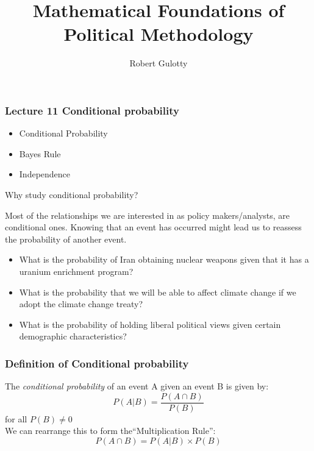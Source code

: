\documentclass[handout]{beamer}
\title[PLSC 43401]{Mathematical Foundations of Political Methodology}
\author{Robert Gulotty}
\institute[Chicago]{University of Chicago}
\numberwithin{equation}{section}
\begin{document}
\begin{frame}
\maketitle
\end{frame}

\begin{frame}
\frametitle{Lecture 11 Conditional probability}

\begin{itemize}
\item Conditional Probability
\item Bayes Rule
\item Independence
\end{itemize}
\end{frame}

\begin{frame}{Why study conditional probability?}

Most of the relationships we are interested in as policy makers/analysts, are conditional ones. Knowing that an event has occurred might lead us to reassess the probability of another event.\pause

\begin{itemize}
\item What is the probability of Iran obtaining nuclear weapons given that it has a uranium enrichment program?\pause
\item What is the probability that we will be able to affect climate change if we adopt the climate change treaty?\pause
\item What is the probability of holding liberal political views given certain demographic characteristics?
\end{itemize}
\end{frame}

\begin{frame}
\frametitle{Definition of Conditional probability}
The \emph{conditional probability} of an event A given an event B is given by:
$$P(A|B)=\frac{P(A\cap B)}{P(B)}$$
for all $P(B)\neq 0$\\
\pause We can rearrange this to form the``Multiplication Rule'':
$$P(A\cap B)=P(A|B)\times P(B)$$

\end{frame}
\end{document}
